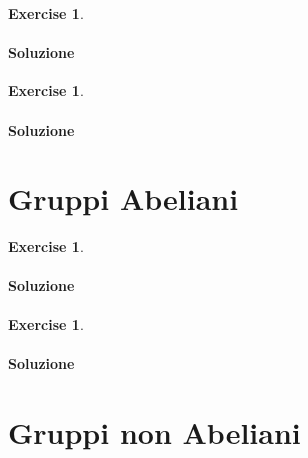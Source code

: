 \documentclass{article}
\theoremstyle{plain}
\theoremstyle{definition}
\newtheorem{xca}[exmp]{Exercise}
\theoremstyle{remark}
\begin{document}
\vspace{10pt}

\begin{bxthm}
\begin{xca}

\end{xca}
\end{bxthm}
\paragraph{Soluzione}

\vspace{10pt}

\begin{bxthm}
\begin{xca}

\end{xca}
\end{bxthm}
\paragraph{Soluzione}

\newpage
\section{Gruppi Abeliani}
\vspace{20pt}

\vspace{10pt}

\begin{bxthm}
\begin{xca}

\end{xca}
\end{bxthm}
\paragraph{Soluzione}

\vspace{10pt}

\begin{bxthm}
\begin{xca}

\end{xca}
\end{bxthm}
\paragraph{Soluzione}

\newpage
\section{Gruppi non Abeliani}
\vspace{20pt}
\end{document}

